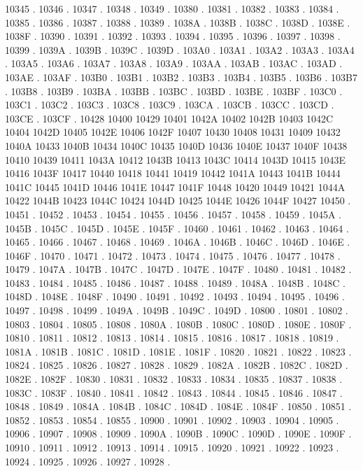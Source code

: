 10345 .
10346 .
10347 .
10348 .
10349 .
10380 .
10381 .
10382 .
10383 .
10384 .
10385 .
10386 .
10387 .
10388 .
10389 .
1038A .
1038B .
1038C .
1038D .
1038E .
1038F .
10390 .
10391 .
10392 .
10393 .
10394 .
10395 .
10396 .
10397 .
10398 .
10399 .
1039A .
1039B .
1039C .
1039D .
103A0 .
103A1 .
103A2 .
103A3 .
103A4 .
103A5 .
103A6 .
103A7 .
103A8 .
103A9 .
103AA .
103AB .
103AC .
103AD .
103AE .
103AF .
103B0 .
103B1 .
103B2 .
103B3 .
103B4 .
103B5 .
103B6 .
103B7 .
103B8 .
103B9 .
103BA .
103BB .
103BC .
103BD .
103BE .
103BF .
103C0 .
103C1 .
103C2 .
103C3 .
103C8 .
103C9 .
103CA .
103CB .
103CC .
103CD .
103CE .
103CF .
10428 10400
10429 10401
1042A 10402
1042B 10403
1042C 10404
1042D 10405
1042E 10406
1042F 10407
10430 10408
10431 10409
10432 1040A
10433 1040B
10434 1040C
10435 1040D
10436 1040E
10437 1040F
10438 10410
10439 10411
1043A 10412
1043B 10413
1043C 10414
1043D 10415
1043E 10416
1043F 10417
10440 10418
10441 10419
10442 1041A
10443 1041B
10444 1041C
10445 1041D
10446 1041E
10447 1041F
10448 10420
10449 10421
1044A 10422
1044B 10423
1044C 10424
1044D 10425
1044E 10426
1044F 10427
10450 .
10451 .
10452 .
10453 .
10454 .
10455 .
10456 .
10457 .
10458 .
10459 .
1045A .
1045B .
1045C .
1045D .
1045E .
1045F .
10460 .
10461 .
10462 .
10463 .
10464 .
10465 .
10466 .
10467 .
10468 .
10469 .
1046A .
1046B .
1046C .
1046D .
1046E .
1046F .
10470 .
10471 .
10472 .
10473 .
10474 .
10475 .
10476 .
10477 .
10478 .
10479 .
1047A .
1047B .
1047C .
1047D .
1047E .
1047F .
10480 .
10481 .
10482 .
10483 .
10484 .
10485 .
10486 .
10487 .
10488 .
10489 .
1048A .
1048B .
1048C .
1048D .
1048E .
1048F .
10490 .
10491 .
10492 .
10493 .
10494 .
10495 .
10496 .
10497 .
10498 .
10499 .
1049A .
1049B .
1049C .
1049D .
10800 .
10801 .
10802 .
10803 .
10804 .
10805 .
10808 .
1080A .
1080B .
1080C .
1080D .
1080E .
1080F .
10810 .
10811 .
10812 .
10813 .
10814 .
10815 .
10816 .
10817 .
10818 .
10819 .
1081A .
1081B .
1081C .
1081D .
1081E .
1081F .
10820 .
10821 .
10822 .
10823 .
10824 .
10825 .
10826 .
10827 .
10828 .
10829 .
1082A .
1082B .
1082C .
1082D .
1082E .
1082F .
10830 .
10831 .
10832 .
10833 .
10834 .
10835 .
10837 .
10838 .
1083C .
1083F .
10840 .
10841 .
10842 .
10843 .
10844 .
10845 .
10846 .
10847 .
10848 .
10849 .
1084A .
1084B .
1084C .
1084D .
1084E .
1084F .
10850 .
10851 .
10852 .
10853 .
10854 .
10855 .
10900 .
10901 .
10902 .
10903 .
10904 .
10905 .
10906 .
10907 .
10908 .
10909 .
1090A .
1090B .
1090C .
1090D .
1090E .
1090F .
10910 .
10911 .
10912 .
10913 .
10914 .
10915 .
10920 .
10921 .
10922 .
10923 .
10924 .
10925 .
10926 .
10927 .
10928 .
